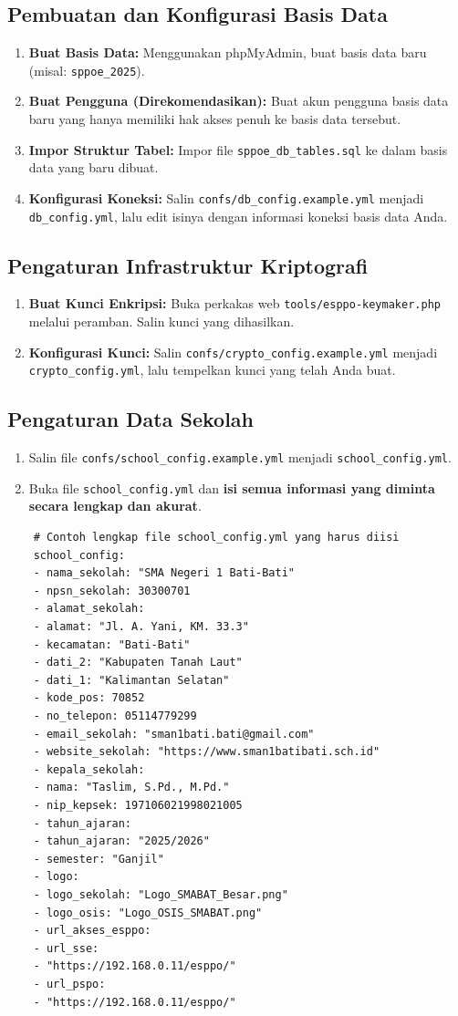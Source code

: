 \subsection{Pembuatan dan Konfigurasi Basis Data}
\begin{enumerate}
	\item \textbf{Buat Basis Data:} Menggunakan phpMyAdmin, buat basis data baru (misal: \texttt{sppoe\_2025}).
	\item \textbf{Buat Pengguna (Direkomendasikan):} Buat akun pengguna basis data baru yang hanya memiliki hak akses penuh ke basis data tersebut.
	\item \textbf{Impor Struktur Tabel:} Impor file \texttt{sppoe\_db\_tables.sql} ke dalam basis data yang baru dibuat.
	\item \textbf{Konfigurasi Koneksi:} Salin \texttt{confs/db\_config.example.yml} menjadi \texttt{db\_config.yml}, lalu edit isinya dengan informasi koneksi basis data Anda.
\end{enumerate}

\subsection{Pengaturan Infrastruktur Kriptografi}
\begin{enumerate}
	\item \textbf{Buat Kunci Enkripsi:} Buka perkakas web \texttt{tools/esppo-keymaker.php} melalui peramban. Salin kunci yang dihasilkan.
	\item \textbf{Konfigurasi Kunci:} Salin \texttt{confs/crypto\_config.example.yml} menjadi \texttt{crypto\_config.yml}, lalu tempelkan kunci yang telah Anda buat.
\end{enumerate}

\subsection{Pengaturan Data Sekolah}
\begin{enumerate}
	\item Salin file \texttt{confs/school\_config.example.yml} menjadi \texttt{school\_config.yml}.
	\item Buka file \texttt{school\_config.yml} dan \textbf{isi semua informasi yang diminta secara lengkap dan akurat}.
\end{enumerate}
\begin{verbatim}
	# Contoh lengkap file school_config.yml yang harus diisi
	school_config:
	- nama_sekolah: "SMA Negeri 1 Bati-Bati"
	- npsn_sekolah: 30300701
	- alamat_sekolah:
	- alamat: "Jl. A. Yani, KM. 33.3"
	- kecamatan: "Bati-Bati"
	- dati_2: "Kabupaten Tanah Laut"
	- dati_1: "Kalimantan Selatan"
	- kode_pos: 70852
	- no_telepon: 05114779299
	- email_sekolah: "sman1bati.bati@gmail.com"
	- website_sekolah: "https://www.sman1batibati.sch.id"
	- kepala_sekolah:
	- nama: "Taslim, S.Pd., M.Pd."
	- nip_kepsek: 197106021998021005
	- tahun_ajaran:
	- tahun_ajaran: "2025/2026"
	- semester: "Ganjil"
	- logo:
	- logo_sekolah: "Logo_SMABAT_Besar.png"
	- logo_osis: "Logo_OSIS_SMABAT.png"
	- url_akses_esppo:
	- url_sse:
	- "https://192.168.0.11/esppo/"
	- url_pspo:
	- "https://192.168.0.11/esppo/"
\end{verbatim}

